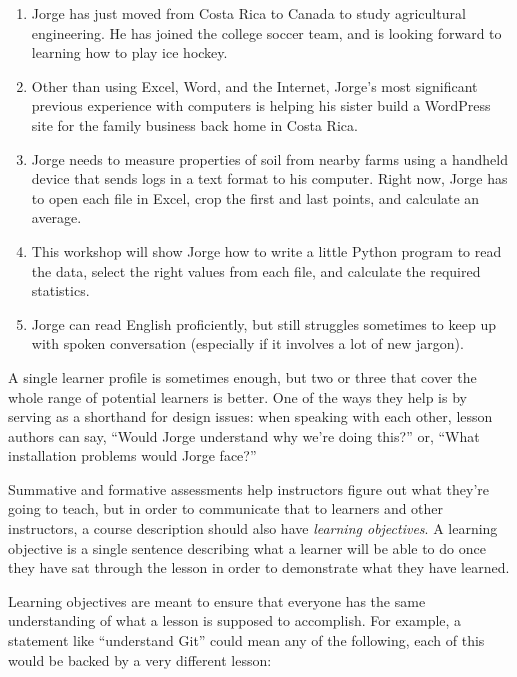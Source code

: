 \begin{enumerate}

\item
  Jorge has just moved from Costa Rica to Canada to study agricultural
  engineering.  He has joined the college soccer team, and is looking
  forward to learning how to play ice hockey.

\item
  Other than using Excel, Word, and the Internet, Jorge's most
  significant previous experience with computers is helping his sister
  build a WordPress site for the family business back home in Costa
  Rica.

\item
  Jorge needs to measure properties of soil from nearby farms using a
  handheld device that sends logs in a text format to his computer.
  Right now, Jorge has to open each file in Excel, crop the first and
  last points, and calculate an average.

\item
  This workshop will show Jorge how to write a little Python program
  to read the data, select the right values from each file, and
  calculate the required statistics.

\item
  Jorge can read English proficiently, but still struggles sometimes
  to keep up with spoken conversation (especially if it involves a lot
  of new jargon).

\end{enumerate}

A single learner profile is sometimes enough, but two or three that
cover the whole range of potential learners is better.  One of the
ways they help is by serving as a shorthand for design issues: when
speaking with each other, lesson authors can say, ``Would Jorge
understand why we're doing this?'' or, ``What installation problems
would Jorge face?''


Summative and formative assessments help instructors figure out what
they're going to teach, but in order to communicate that to learners
and other instructors, a course description should also
have \emph{learning objectives}. A learning objective is a single
sentence describing what a learner will be able to do once they have
sat through the lesson in order to demonstrate what they have learned.

Learning objectives are meant to ensure that everyone has the same
understanding of what a lesson is supposed to accomplish. For example,
a statement like ``understand Git'' could mean any of the following,
each of this would be backed by a very different lesson:

